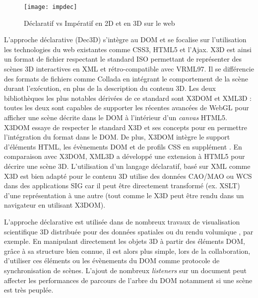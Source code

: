 \begin{figure}[hbt]
	\centering
	\texttt{[image: impdec]}
	\caption{Déclaratif vs Impératif en 2D et en 3D sur le web}
	\label{fig:impdec}
\end{figure}

L'approche déclarative (Dec3D) s'intègre au \gls{DOM} et se 
focalise sur l'utilisation les technologies du web existantes comme CSS3, 
HTML5 et l'Ajax. 
X3D est ainsi un format de fichier respectant le standard ISO \cite{X3D2011} permettant de 
représenter des scènes 3D interactives en XML et rétro-compatible avec VRML97. Il 
se différencie des formats de fichiers comme Collada en intégrant le comportement de 
la scène durant l'exécution, en plus de la description du contenu 3D. Les deux 
bibliothèques les plus notables dérivées de ce standard sont X3DOM 
\cite{Behr2010} et XML3D \cite{Sons2010} : toutes les deux sont capables de 
supporter les récentes avancées de WebGL pour afficher une scène décrite dans 
le \gls{DOM} à l'intérieur d'un \textit{canvas} HTML5. 
X3DOM essaye de respecter le standard X3D et ses concepts pour en permettre 
l'intégration du format dans le \gls{DOM}. De plus, X3DOM intègre le support 
d'éléments \gls{HTML}, les évènements \gls{DOM} et de profils \acrshort{CSS} en 
supplément \cite{Sutter2015}. 
En comparaison avec X3DOM, XML3D a développé une extension à \gls{HTML}5 
pour décrire une scène 3D. 
L'utilisation d'un langage déclaratif, basé sur XML comme X3D est bien 
adapté pour le contenu 3D utilise des données CAO/MAO ou WCS dans des 
applications \gls{SIG} car il peut être directement transformé (ex. XSLT) d'une 
représentation à une autre (tout comme le X3D peut être rendu dans un navigateur 
en utilisant X3DOM). 

L'approche déclarative est utilisée dans de nombreux travaux de visualisation 
scientifique 3D distribuée \cite{Jung2012} pour des données spatiales 
\cite{Stein2014} ou du rendu volumique \cite{Becher2012}, par exemple. 
En manipulant directement les objets 3D à partir des éléments \gls{DOM}, grâce à 
sa structure bien connue, il est alors plus simple, lors de la collaboration, d'utiliser 
ces éléments \cite{Gadea2016} ou les évènements du \gls{DOM} \cite{Lowet2009} 
comme protocole de synchronisation de scènes. 
L'ajout de nombreux \textit{listeners} sur un document peut affecter les 
performances de parcours de l'arbre du \gls{DOM} notamment si une scène est
très peuplée.

